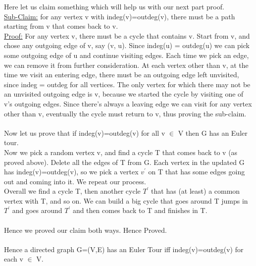 \documentclass[a4 paper]{article}
\begin{document}
Here let us claim something which will help us with our next part proof. \\
\underline{Sub-Claim:} for any vertex v with indeg(v)=outdeg(v), there must be a path starting from v that comes back to v.\\
\underline{Proof:} For any vertex v, there must be a cycle that contains v. Start from v, and chose any outgoing edge of v, say (v, u). Since indeg(u) = outdeg(u) we can pick some outgoing edge of u and continue visiting edges. Each time we pick an edge, we can remove it from further consideration. At each vertex other than v, at the time we visit an entering edge, there must be an outgoing edge left unvisited, since indeg = outdeg for all vertices. The only vertex for which there may not be an unvisited outgoing edge is v, because we started the cycle by visiting one of v’s outgoing edges. Since there’s always a leaving edge we can visit for any vertex other than v, eventually the cycle must return to v, thus proving the sub-claim.\\\\
Now let us prove that if indeg(v)=outdeg(v) for all v $\in$ V then G has an Euler tour.\\
Now we pick a random vertex v, and find a cycle T that comes back to v (as proved above). Delete all the edges of T from G. Each vertex in the updated G has indeg(v)=outdeg(v), so we pick a vertex $v^{'}$ on T that has some edges going out and coming into it. We repeat our process.\\
Overall we find a cycle T, then another cycle $T^{'}$ that has (at least) a common vertex with T, and so on. We can build a big cycle that goes around T jumps in $T^{'}$ and goes around $T^{'}$ and then comes back to T and finishes in T.\\\\
Hence we proved our claim  both ways. Hence Proved.\\\\ Hence a directed graph G=(V,E) has an Euler Tour iff indeg(v)=outdeg(v) for each v $\in$ V.\\
\end{document}
